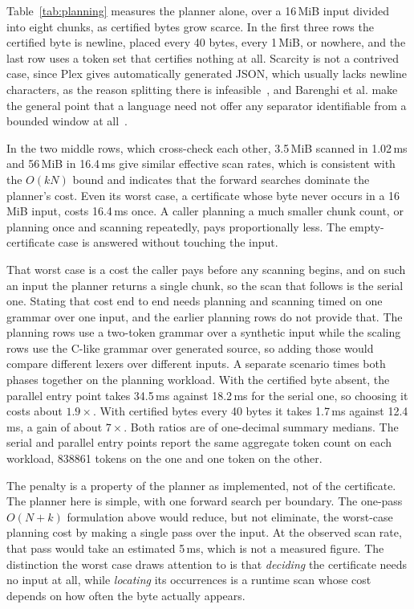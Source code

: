 \documentclass[11pt,a4paper]{article}
\theoremstyle{definition}
\theoremstyle{plain}
\begin{document}
Table~\ref{tab:planning} measures the planner alone, over a 16\,MiB input divided into eight chunks, as certified bytes
grow scarce. In the first three rows the certified byte is newline, placed every 40 bytes, every 1\,MiB, or nowhere, and
the last row uses a token set that certifies nothing at all. Scarcity is not a contrived case, since Plex gives
automatically generated JSON, which usually lacks newline characters, as the reason splitting there is
infeasible~\cite{li2021plex}, and Barenghi et al. make the general point that a language need not offer any separator
identifiable from a bounded window at all~\cite{barenghi2015parallel}.

In the two middle rows, which cross-check each other, 3.5\,MiB scanned in 1.02\,ms and 56\,MiB in 16.4\,ms give similar
effective scan rates, which is consistent with the $O(kN)$ bound and indicates that the forward searches dominate the
planner's cost. Even its worst case, a certificate whose byte never occurs in a 16\,MiB input, costs 16.4\,ms once. A
caller planning a much smaller chunk count, or planning once and scanning repeatedly, pays proportionally less. The
empty-certificate case is answered without touching the input.

That worst case is a cost the caller pays before any scanning begins, and on such an input the planner returns a single
chunk, so the scan that follows is the serial one. Stating that cost end to end needs planning and scanning timed on one
grammar over one input, and the earlier planning rows do not provide that. The planning rows use a two-token grammar
over a synthetic input while the scaling rows use the C-like grammar over generated source, so adding those would
compare different lexers over different inputs. A separate scenario times both phases together on the planning workload.
With the certified byte absent, the parallel entry point takes 34.5\,ms against 18.2\,ms for the serial one, so choosing
it costs about $1.9\times$. With certified bytes every 40 bytes it takes 1.7\,ms against 12.4\,ms, a gain of about
$7\times$. Both ratios are of one-decimal summary medians. The serial and parallel entry points report the same
aggregate token count on each workload, 838861 tokens on the one and one token on the other.

The penalty is a property of the planner as implemented, not of the certificate. The planner here is simple, with one
forward search per boundary. The one-pass $O(N + k)$ formulation above would reduce, but not eliminate, the worst-case
planning cost by making a single pass over the input. At the observed scan rate, that pass would take an estimated
5\,ms, which is not a measured figure. The distinction the worst case draws attention to is that \emph{deciding} the
certificate needs no input at all, while \emph{locating} its occurrences is a runtime scan whose cost depends on how
often the byte actually appears.
\end{document}
